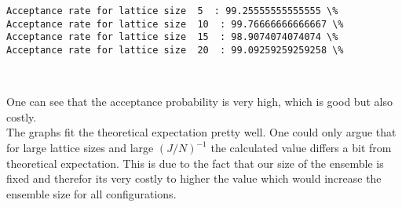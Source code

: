 \documentclass[11pt]{article}
\begin{document}
    \begin{Verbatim}[commandchars=\\\{\}]
Acceptance rate for lattice size  5  : 99.25555555555555 \%
Acceptance rate for lattice size  10  : 99.76666666666667 \%
Acceptance rate for lattice size  15  : 98.9074074074074 \%
Acceptance rate for lattice size  20  : 99.09259259259258 \%
    \end{Verbatim}

    \begin{center}
    \end{center}
    { \hspace*{\fill} \\}
    
    One can see that the acceptance probability is very high, which is good
but also costly.\\
The graphs fit the theoretical expectation pretty well. One could only
argue that for large lattice sizes and large \((J/N)^{-1}\) the
calculated value differs a bit from theoretical expectation. This is due
to the fact that our size of the ensemble is fixed and therefor its very
costly to higher the value which would increase the ensemble size for
all configurations.
\end{document}
